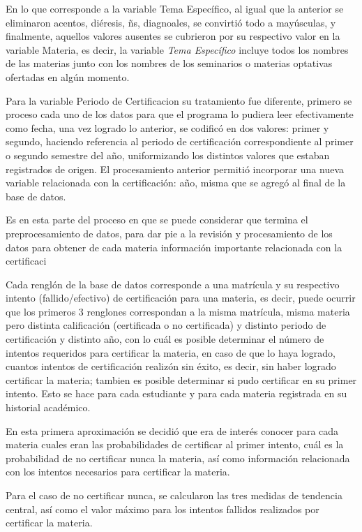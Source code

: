 \documentclass[12pt]{article}
\begin{document}
En lo que corresponde a la variable Tema Espec\'ifico, al igual que la anterior se eliminaron acentos, di\'eresis, \~ns, diagnoales, se convirti\'o todo a may\'usculas, y finalmente, aquellos valores ausentes se cubrieron por su respectivo valor en la variable Materia, es decir, la variable \textit{Tema Espec\'ifico} incluye todos los nombres de las materias junto con los nombres de los seminarios o materias optativas ofertadas en alg\'un momento.

Para la variable Periodo de Certificacion su tratamiento fue diferente, primero se proceso cada uno de los datos para que el programa lo pudiera leer efectivamente como fecha, una vez logrado lo anterior, se codific\'o en dos valores: primer y segundo, haciendo referencia al periodo de certificaci\'on correspondiente al primer o segundo semestre del a\~no, uniformizando los distintos valores que estaban registrados de origen. El procesamiento anterior permiti\'o incorporar una nueva variable relacionada con la certificaci\'on: a\~no, misma que se agreg\'o al final de la base de datos.

Es en esta parte del proceso en que se puede considerar que termina el preprocesamiento de datos, para dar pie a la revisión y procesamiento de los datos para obtener de cada materia informaci\'on importante relacionada con la certificaci\

Cada rengl\'on de la base de datos corresponde a una matr\'icula y su respectivo intento (fallido/efectivo) de certificaci\'on para una materia, es decir, puede ocurrir que los primeros 3 renglones correspondan a la misma matr\'icula, misma materia pero distinta calificaci\'on (certificada o no certificada) y distinto periodo de certificaci\'on y distinto a\~no, con lo cu\'al es posible determinar el n\'umero de intentos requeridos para certificar la materia, en caso de que lo haya logrado, cuantos intentos de certificaci\'on realiz\'on sin \'exito, es decir, sin haber logrado certificar la materia; tambien es posible determinar si pudo certificar en su primer intento. Esto se hace para cada estudiante y para cada materia registrada en su historial acad\'emico. 


En esta primera aproximaci\'on se decidi\'o que era de inter\'es conocer para cada materia cuales eran las probabilidades de certificar al primer intento, cu\'al es la probabilidad de no certificar nunca la materia, as\'i como informaci\'on  relacionada con los intentos necesarios para certificar la materia.

Para el caso de no certificar nunca, se calcularon las tres medidas de tendencia central, as\'i como el valor m\'aximo para los intentos fallidos realizados por certificar la materia.
\end{document}
